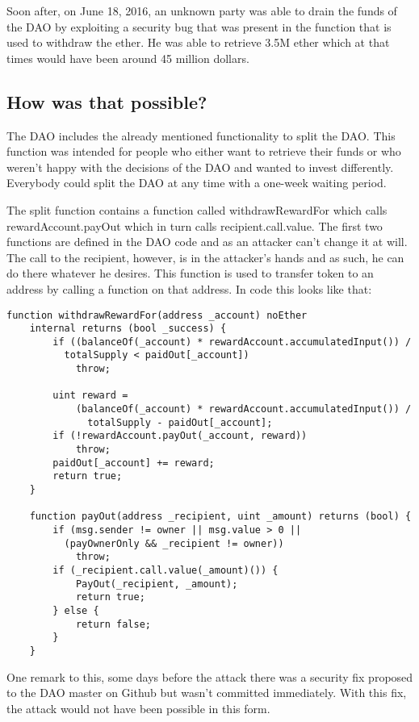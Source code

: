 \documentclass[a4paper, 11pt]{scrartcl}
\begin{document}
Soon after, on June 18, 2016, an unknown party was able to drain the funds of the DAO by exploiting a security bug that was present in the function that is used to withdraw the ether.
He was able to retrieve 3.5M ether which at that times would have been around 45 million dollars.

\subsection{How was that possible?}

The DAO includes the already mentioned functionality to split the DAO.
This function was intended for people who either want to retrieve their funds or who weren't happy with the decisions of the DAO and wanted to invest differently.
Everybody could split the DAO at any time with a one-week waiting period.

The split function contains a function called withdrawRewardFor which calls rewardAccount.payOut which in turn calls \textunderscore recipient.call.value. The first two functions are defined in the DAO code and as an attacker can't change it at will. The call to the recipient, however, is in the attacker's hands and as such, he can do there whatever he desires. This function is used to transfer token to an address by calling a function on that address. In code this looks like that: \cite{deconstructingDaoAttack}

\begin{lstlisting}[language=Solidity]
  function withdrawRewardFor(address _account) noEther 
    internal returns (bool _success) {
        if ((balanceOf(_account) * rewardAccount.accumulatedInput()) /
          totalSupply < paidOut[_account])
            throw;

        uint reward =
            (balanceOf(_account) * rewardAccount.accumulatedInput()) /
              totalSupply - paidOut[_account];
        if (!rewardAccount.payOut(_account, reward))
            throw;
        paidOut[_account] += reward;
        return true;
    }

    function payOut(address _recipient, uint _amount) returns (bool) {
        if (msg.sender != owner || msg.value > 0 ||
          (payOwnerOnly && _recipient != owner))
            throw;
        if (_recipient.call.value(_amount)()) {
            PayOut(_recipient, _amount);
            return true;
        } else {
            return false;
        }
    }
\end{lstlisting}

One remark to this, some days before the attack there was a security fix proposed to the DAO master on Github but wasn't committed immediately. With this fix, the attack would not have been possible in this form. \cite{securityFixPayout}
\end{document}
